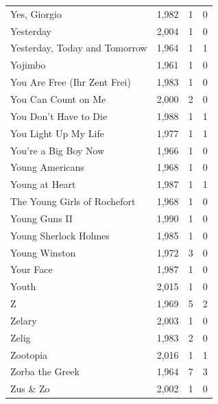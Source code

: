 \begin{tabular}{lrrr}
Yes, Giorgio & 1,982 & 1 & 0 \\
Yesterday & 2,004 & 1 & 0 \\
Yesterday, Today and Tomorrow & 1,964 & 1 & 1 \\
Yojimbo & 1,961 & 1 & 0 \\
You Are Free (Ihr Zent Frei) & 1,983 & 1 & 0 \\
You Can Count on Me & 2,000 & 2 & 0 \\
You Don't Have to Die & 1,988 & 1 & 1 \\
You Light Up My Life & 1,977 & 1 & 1 \\
You're a Big Boy Now & 1,966 & 1 & 0 \\
Young Americans & 1,968 & 1 & 0 \\
Young at Heart & 1,987 & 1 & 1 \\
The Young Girls of Rochefort & 1,968 & 1 & 0 \\
Young Guns II & 1,990 & 1 & 0 \\
Young Sherlock Holmes & 1,985 & 1 & 0 \\
Young Winston & 1,972 & 3 & 0 \\
Your Face & 1,987 & 1 & 0 \\
Youth & 2,015 & 1 & 0 \\
Z & 1,969 & 5 & 2 \\
Zelary & 2,003 & 1 & 0 \\
Zelig & 1,983 & 2 & 0 \\
Zootopia & 2,016 & 1 & 1 \\
Zorba the Greek & 1,964 & 7 & 3 \\
Zus \& Zo & 2,002 & 1 & 0 \\
\bottomrule
\end{tabular}